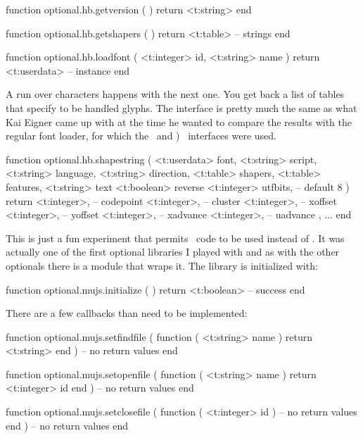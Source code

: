\starttyping[option=LUA]
function optional.hb.getversion ( )
    return <t:string>
end
\stoptyping

\starttyping[option=LUA]
function optional.hb.getshapers ( )
    return <t:table> -- strings
end
\stoptyping

\starttyping[option=LUA]
function optional.hb.loadfont (
    <t:integer> id,
    <t:string>  name
)
    return <t:userdata> -- instance
end
\stoptyping

A run over characters happens with the next one. You get back a list of tables
that specify to be handled glyphs. The interface is pretty much the same as what
Kai Eigner came up with at the time he wanted to compare the results with the
regular font loader, for which the \LUATEX\ and \LUAJITTEX) \FFI\ interfaces were
used.

\starttyping[option=LUA]
function optional.hb.shapestring (
    <t:userdata> font,
    <t:string>   script,
    <t:string>   language,
    <t:string>   direction,
    <t:table>    shapers,
    <t:table>    features,
    <t:string>   text
    <t:boolean>  reverse
    <t:integer>  utfbits, -- default 8
)
    return {
        {
            <t:integer>, -- codepoint
            <t:integer>, -- cluster
            <t:integer>, -- xoffset
            <t:integer>, -- yoffset
            <t:integer>, -- xadvance
            <t:integer>, -- uadvance
        },
        ...
    }
end
\stoptyping

\stopsubsubsubject

\startsubsubsubject[title=mujs]

This is just a fun experiment that permits \JAVASCRIPT\ code to be used instead of
\LUA. It was actually one of the first optional libraries I played with and as
with the other optionals there is a module that wraps it. The library is
initialized with:

\starttyping[option=LUA]
function optional.mujs.initialize ( )
    return <t:boolean> -- success
end
\stoptyping

There are a few  callbacks than need to be implemented:

\starttyping[option=LUA]
function optional.mujs.setfindfile (
    function ( <t:string> name )
        return <t:string>
    end
)
    -- no return values
end

function optional.mujs.setopenfile  (
    function ( <t:string> name )
        return <t:integer> id
    end
)
    -- no return values
end

function optional.mujs.setclosefile (
    function ( <t:integer> id )
        -- no return values
    end
)
    -- no return values
end


